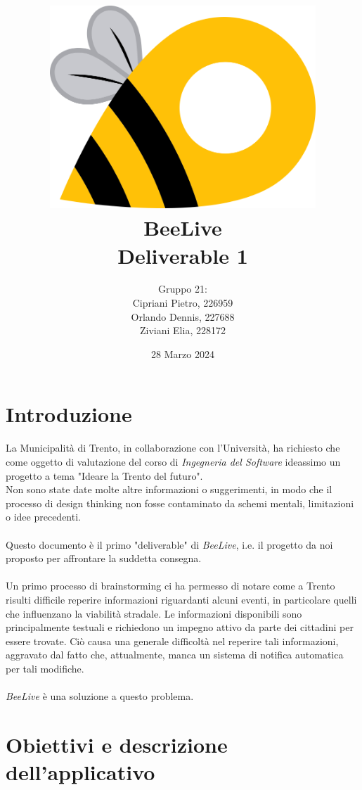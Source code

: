 \documentclass{article}
\title{\includegraphics[width=0.75\textwidth]{Images/BeeLive-Logo.png}\\\vspace{100pt}
\LARGE{\textbf{BeeLive\\Deliverable 1}}}
\author{Gruppo 21:\\
Cipriani Pietro, 226959\\
Orlando Dennis, 227688\\
Ziviani Elia, 228172}
\date{28 Marzo 2024}
\begin{document}
\maketitle
\thispagestyle{firstpage} %
\clearpage

\pagestyle{nonplain} %

\renewcommand{\contentsname}{Indice}
\tableofcontents

\clearpage
\section{Introduzione}

La Municipalità di Trento, in collaborazione con l'Università, ha richiesto che come oggetto di valutazione del corso di \textit{Ingegneria del Software} ideassimo un progetto a tema "Ideare la Trento del futuro".\\
Non sono state date molte altre informazioni o suggerimenti, in modo che il processo di design thinking non fosse contaminato da schemi mentali, limitazioni o idee precedenti. \\
\\
Questo documento è il primo "deliverable" di \textit{BeeLive}, i.e. il progetto da noi proposto per affrontare la suddetta consegna. \\
\\
Un primo processo di brainstorming ci ha permesso di notare come a Trento risulti difficile reperire informazioni riguardanti alcuni eventi, in particolare quelli che influenzano la viabilità stradale. Le informazioni disponibili sono principalmente testuali e richiedono un impegno attivo da parte dei cittadini per essere trovate.
Ciò causa una generale difficoltà nel reperire tali informazioni, aggravato dal fatto che, attualmente, manca un sistema di notifica automatica per tali modifiche.\\
\\
\textit{BeeLive} è una soluzione a questo problema. 

\clearpage

\section{Obiettivi e descrizione dell'applicativo}
\end{document}
